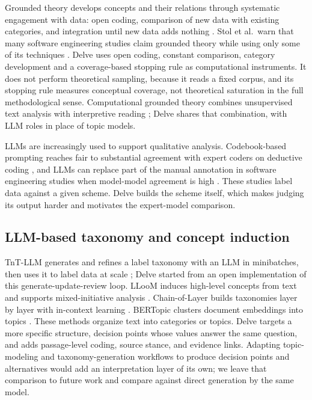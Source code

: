 \documentclass[conference]{IEEEtran}
\begin{document}
Grounded theory develops concepts and their relations through systematic engagement with data: open coding, comparison of new data with existing categories, and integration until new data adds nothing \cite{stol}. Stol et al.~warn that many software engineering studies claim grounded theory while using only some of its techniques \cite{stol}. Delve uses open coding, constant comparison, category development and a coverage-based stopping rule as computational instruments. It does not perform theoretical sampling, because it reads a fixed corpus, and its stopping rule measures conceptual coverage, not theoretical saturation in the full methodological sense. Computational grounded theory combines unsupervised text analysis with interpretive reading \cite{nelson}; Delve shares that combination, with LLM roles in place of topic models.

LLMs are increasingly used to support qualitative analysis. Codebook-based prompting reaches fair to substantial agreement with expert coders on deductive coding \cite{xiao,chew}, and LLMs can replace part of the manual annotation in software engineering studies when model-model agreement is high \cite{ahmed}. These studies label data against a given scheme. Delve builds the scheme itself, which makes judging its output harder and motivates the expert-model comparison.

\subsection{LLM-based taxonomy and concept induction}

TnT-LLM generates and refines a label taxonomy with an LLM in minibatches, then uses it to label data at scale \cite{tnt}; Delve started from an open implementation of this generate-update-review loop. LLooM induces high-level concepts from text and supports mixed-initiative analysis \cite{lloom}. Chain-of-Layer builds taxonomies layer by layer with in-context learning \cite{chainoflayer}. BERTopic clusters document embeddings into topics \cite{bertopic}. These methods organize text into categories or topics. Delve targets a more specific structure, decision points whose values answer the same question, and adds passage-level coding, source stance, and evidence links. Adapting topic-modeling and taxonomy-generation workflows to produce decision points and alternatives would add an interpretation layer of its own; we leave that comparison to future work and compare against direct generation by the same model.
\end{document}
